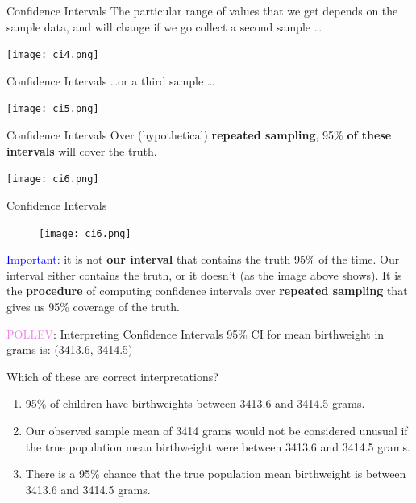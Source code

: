 \documentclass[10pt,t]{beamer}
\begin{document}
\begin{frame}{Confidence Intervals}
The particular range of values that we get depends on the sample data, and will change if we go collect a second sample \dots

\centering \texttt{[image: ci4.png]}

\end{frame}

\begin{frame}{Confidence Intervals}
\dots or a third sample \dots

\centering \texttt{[image: ci5.png]}

\end{frame}

\begin{frame}{Confidence Intervals}
Over (hypothetical) \textbf{repeated sampling}, 95\% \textbf{of these intervals} will cover the truth.

\centering \texttt{[image: ci6.png]}

\end{frame}

\begin{frame}{Confidence Intervals}

\begin{figure}
\centering \texttt{[image: ci6.png]}
\end{figure}


\textcolor{blue}{Important:} it is not \textbf{our interval} that contains the truth 95\% of the time. Our interval either contains the truth, or it doesn't (as the image above shows). It is the \textbf{procedure} of computing confidence intervals over \textbf{repeated sampling} that gives us 95\% coverage of the truth.

\end{frame}

\begin{frame}{\textcolor{violet}{POLLEV}: Interpreting Confidence Intervals}
95\% CI for mean birthweight in grams is: (3413.6, 3414.5)

\vspace{0.3cm}

Which of these are correct interpretations?

\vspace{0.3cm}

\begin{enumerate}
	\item 95\% of children have birthweights between 3413.6 and 3414.5 grams.
	\medskip
	\item Our observed sample mean of 3414 grams would not be considered unusual if the true population mean birthweight were between 3413.6 and 3414.5 grams.
	\medskip
	\item There is a 95\% chance that the true population mean birthweight is between 3413.6 and 3414.5 grams.
\end{enumerate}
\end{frame}
\end{document}
